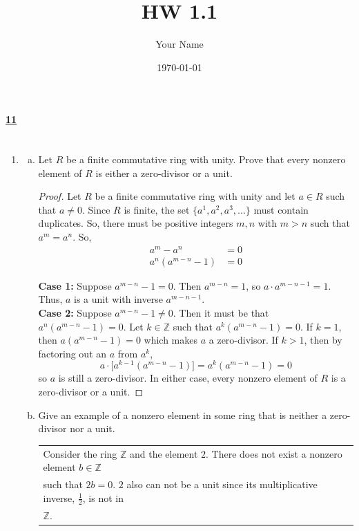 \documentclass[12pt, letterpaper]{article}
\title{HW 1.1}
\author{Your Name}
\date{\today}
\begin{document}
\paragraph{\underline{11} \\ \\}

\begin{enumerate}

    \item %
    \begin{enumerate}[(a)]
        \item Let $R$ be a finite commutative ring with unity. Prove that every nonzero element of $R$ is either a zero-divisor or a unit.

        \begin{proof}
            Let $R$ be a finite commutative ring with unity and let $a \in R$ such that $a \neq 0$.
            Since $R$ is finite, the set $\{a^{1}, a^{2}, a^{3}, ... \}$ must contain duplicates. So, there must be positive integers $m, n$ with $m > n$
           such that $a^m = a^n$. So,
            \begin{align*}
                a^m - a^n &= 0 \\
                a^n(a^{m-n} - 1) &= 0
            \end{align*}

            \textbf{Case 1:} Suppose $a^{m-n} - 1 = 0$. Then $a^{m-n} = 1$, so $a \cdot a^{m-n-1} = 1$.
            Thus, $a$ is a unit with inverse $a^{m-n-1}$. \\

            \textbf{Case 2:} Suppose $a^{m-n} - 1 \neq 0$. Then it must be that $a^n(a^{m-n} - 1) = 0$.
            Let $k \in \mathbb{Z}$ such that $a^k(a^{m-n} - 1) = 0$.
            If $k = 1$, then $a(a^{m-n} - 1) = 0$ which makes $a$ a zero-divisor.
            If $k > 1$, then by factoring out an $a$ from $a^k$,
            \[
                a \cdot \big[a^{k-1}(a^{m-n} - 1)\big] = a^k(a^{m-n} - 1) = 0
            \]
            so $a$ is still a zero-divisor. In either case, every nonzero element of $R$ is a zero-divisor or a unit.
        \end{proof}

        \item Give an example of a nonzero element in some ring that is neither a zero-divisor nor a unit.

        \begin{tabular}[t]{l}
            Consider the ring $\mathbb{Z}$ and the element $2$. There does not exist a nonzero element $b \in \mathbb{Z}$ \\
            such that $2b = 0$. $2$ also can not be a unit since its multiplicative inverse, $\frac{1}{2}$, is not in \\
            $\mathbb{Z}$. 
            \end{tabular} \\
    \end{enumerate}


\end{enumerate}
\end{document}
